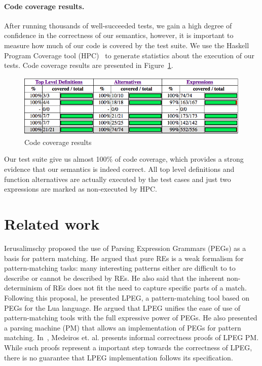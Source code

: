 \documentclass[sigplan]{acmart}
\theoremstyle{definition}
\begin{document}
\paragraph{Code coverage results.}

After running thousands of well-succeeded tests, we gain a high degree of confidence in the correctness
of our semantics, however, it is important to measure how much of our code is covered by the test suite.
We use the Haskell Program Coverage tool (HPC)~\cite{Gill2007} to generate statistics about the execution of our tests.
Code coverage results are presented in Figure~\ref{figure:coverage}.

\begin{figure}[h!]
  \includegraphics[width=\linewidth]{coverage-results.png}
  \caption{Code coverage results}
  \label{figure:coverage}
\end{figure}

Our test suite give us almost 100\% of code coverage, which provides a strong evidence that our semantics
is indeed correct. All top level definitions and function alternatives are actually executed by the test cases
and just two expressions are marked as non-executed by HPC.

\section{Related work}\label{section:related}

Ierusalimschy \cite{Ierusalimschy2009} proposed the use of Parsing Expression Grammars (PEGs) as a basis
for pattern matching. He argued that pure REs is a weak formalism for pattern-matching tasks:
many interesting patterns either are difficult to to describe or cannot be described by REs. He also said
that the inherent non-determinism of REs does not fit the need to capture specific parts of a match. Following
this proposal, he presented LPEG, a pattern-matching tool based on PEGs for the Lua language. He
argued that LPEG unifies the ease of use of pattern-matching tools with the full expressive power of PEGs.
He also presented a parsing machine (PM) that allows an implementation of PEGs for pattern matching.
In~\cite{Medeiros2008}, Medeiros et. al. presents informal correctness proofs of LPEG PM.
While such proofs represent a important step towards the correctness of LPEG, there is no guarantee that LPEG
implementation follows its specification.
\end{document}
